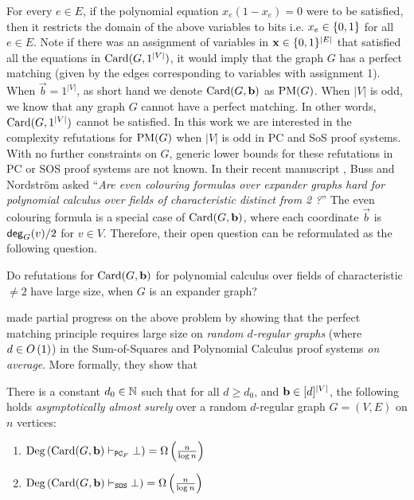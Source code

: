 \documentclass[11pt]{article}
\begin{document}
For every $e \in E$, if the polynomial equation $x_e(1 - x_e) = 0$ were to be satisfied, then it restricts the domain of the above variables to bits i.e. $x_e \in \{0,1\}$ for all $e \in E$.
Note if there was an assignment of variables in $\mathbf{x} \in \{0,1\}^{|E|}$ that satisfied all the equations in $\text{Card}(G, 1^{|V|})$, it would imply that the graph $G$ has a perfect matching (given by the edges corresponding to variables with assignment 1).  
When $\vec{b} = 1^{|V|}$, as short hand we denote $\text{Card}(G, \mathbf{b})$ as $\text{PM}(G)$.
When $|V|$ is odd, we know that any graph $G$ cannot have a perfect matching.
In other words, $\text{Card}(G, 1^{|V|})$ cannot be satisfied.
In this work we are interested in the complexity refutations for $\text{PM}(G)$  when $|V|$ is odd in PC and SoS proof systems.
With no further constraints on $G$, generic lower bounds for these refutations in PC or SOS proof systems are not known.
In their recent manuscript \citep[Open Problem 7.7]{buss2021proof}, Buss and Nordstr{\"o}m asked ``\textit{Are even colouring formulas over expander graphs hard for
polynomial calculus over fields of characteristic distinct from 2 ?}''
The even colouring formula is a special case of $\text{Card}(G, \mathbf{b})$, where each coordinate  $\vec{b}$ is $\mathsf{deg}_{G}(v)/2$ for $v \in V$.
Therefore, their open question can be reformulated as the following question.

\begin{problem}

Do refutations for $\text{Card}(G, \mathbf{b})$ for
polynomial calculus over fields of characteristic $\neq 2$ have large size, when $G$ is an expander graph? \citep[Open Problem 7.7]{buss2021proof}

\end{problem}

\citet{Austrin_2022} made partial progress on the above problem by showing that the perfect matching principle requires large size on \emph{random $d$-regular graphs} (where $d \in O\left(1\right)$) in the Sum-of-Squares and Polynomial Calculus proof systems \emph{on average}.
More formally, they show that 

\begin{theorem}\label{thm:prev-thm}
There is a constant $d_0 \in \mathbb{N}$ such that for all $d \geq d_0$, and $\mathbf{b} \in [d]^{|V|}$, the following holds \emph{asymptotically almost surely} over a random $d$-regular graph $G=(V,E)$ on $n$ vertices:
\begin{enumerate}
    \item{ $\text{Deg}\left(\text{Card}(G, \mathbf{b}) \vdash_{\texttt{PC}_F} \bot\right) = \Omega\left(\frac{n}{\log n}\right)$} 
    \item{$\text{Deg}\left(\text{Card}(G, \mathbf{b}) \vdash_{\texttt{SOS}} \bot\right) = \Omega\left(\frac{n}{\log n}\right)$}
\end{enumerate}
\end{theorem}
\end{document}

